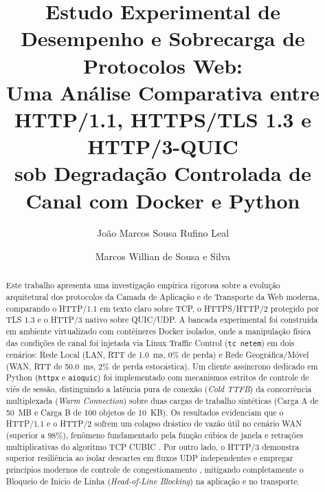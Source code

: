 \documentclass[12pt]{article}
\title{Estudo Experimental de Desempenho e Sobrecarga de Protocolos Web:\\
Uma Análise Comparativa entre HTTP/1.1, HTTPS/TLS 1.3 e HTTP/3-QUIC\\
sob Degradação Controlada de Canal com Docker e Python}
\author{João Marcos Sousa Rufino Leal\inst{1} \and Marcos Willian de Sousa e Silva\inst{1}}
\begin{document}
\maketitle

\begin{abstract}
Este trabalho apresenta uma investigação empírica rigorosa sobre a evolução arquitetural dos protocolos da Camada de Aplicação e de Transporte da Web moderna, comparando o HTTP/1.1 em texto claro sobre TCP, o HTTPS/HTTP/2 protegido por TLS 1.3 e o HTTP/3 nativo sobre QUIC/UDP. A bancada experimental foi construída em ambiente virtualizado com contêineres Docker isolados, onde a manipulação física das condições de canal foi injetada via Linux Traffic Control (\texttt{tc netem}) em dois cenários: Rede Local (LAN, RTT de 1.0~ms, 0\% de perda) e Rede Geográfica/Móvel (WAN, RTT de 50.0~ms, 2\% de perda estocástica). Um cliente assíncrono dedicado em Python (\texttt{httpx} e \texttt{aioquic}) foi implementado com mecanismos estritos de controle de viés de sessão, distinguindo a latência pura de conexão (\textit{Cold TTFB}) da concorrência multiplexada (\textit{Warm Connection}) sobre duas cargas de trabalho sintéticas (Carga A de 50~MB e Carga B de 100 objetos de 10~KB). Os resultados evidenciam que o HTTP/1.1 e o HTTP/2 sofrem um colapso drástico de vazão útil no cenário WAN (superior a 98\%), fenômeno fundamentado pela função cúbica de janela e retrações multiplicativas do algoritmo TCP CUBIC \cite{tanenbaum2021}. Por outro lado, o HTTP/3 demonstra superior resiliência ao isolar descartes em fluxos UDP independentes e empregar princípios modernos de controle de congestionamento \cite{tanenbaum2021}, mitigando completamente o Bloqueio de Início de Linha (\textit{Head-of-Line Blocking}) na aplicação e no transporte.
\end{abstract}
\end{document}
